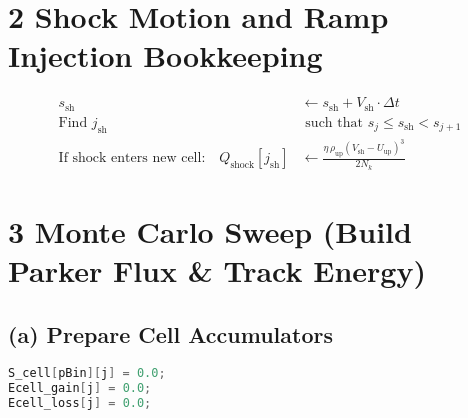 \section*{2 Shock Motion and Ramp Injection Bookkeeping}
\begin{align*}
s_{\mathrm{sh}} &\leftarrow s_{\mathrm{sh}} + V_{\mathrm{sh}} \cdot \Delta t \\
\text{Find } j_{\mathrm{sh}} &\text{ such that } s_j \leq s_{\mathrm{sh}} < s_{j+1} \\
\text{If shock enters new cell:} \quad
Q_{\mathrm{shock}}[j_{\mathrm{sh}}] &\leftarrow 
\frac{\eta \, \rho_{\mathrm{up}} \left(V_{\mathrm{sh}} - U_{\mathrm{up}}\right)^3}{2 N_k}
\end{align*}

\section*{3 Monte Carlo Sweep (Build Parker Flux \& Track Energy)}
\subsection*{(a) Prepare Cell Accumulators}
\begin{lstlisting}[language=C++]
S_cell[pBin][j] = 0.0;
Ecell_gain[j] = 0.0;
Ecell_loss[j] = 0.0;
\end{lstlisting}

